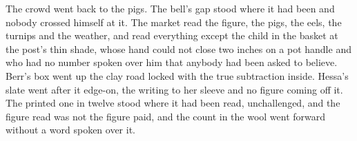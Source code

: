 The crowd went back to the pigs. The bell's gap stood where it had been and nobody crossed himself at it. The market read the figure, the pigs, the eels, the turnips and the weather, and read everything except the child in the basket at the post's thin shade, whose hand could not close two inches on a pot handle and who had no number spoken over him that anybody had been asked to believe. Berr's box went up the clay road locked with the true subtraction inside. Hessa's slate went after it edge-on, the writing to her sleeve and no figure coming off it. The printed one in twelve stood where it had been read, unchallenged, and the figure read was not the figure paid, and the count in the wool went forward without a word spoken over it.
